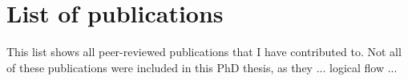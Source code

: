 \chapter{List of publications}
\label{chp:Publicationlist}

This list shows all peer-reviewed publications that I have contributed to. Not all of these publications were included in this PhD thesis, as they ... logical flow ...\\

\\

\\

\\

\\

\\

\\

\\

\\

\\

\\

\\

\\

\\